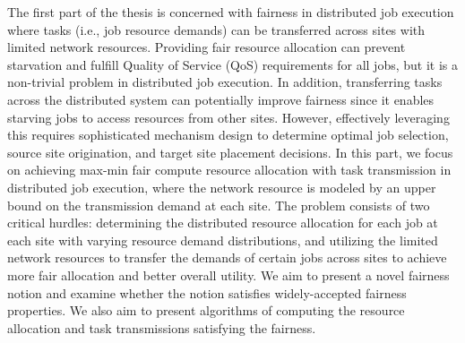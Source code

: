 The first part of the thesis is concerned with fairness in distributed job execution where tasks (i.e., job resource demands) can be transferred across sites with limited network resources. Providing fair resource allocation can prevent starvation and fulfill Quality of Service (QoS) requirements for all jobs, but it is a non-trivial problem in distributed job execution. In addition, transferring tasks across the distributed system can potentially improve fairness since it enables starving jobs to access resources from other sites. However, effectively leveraging this requires sophisticated mechanism design to determine optimal job selection, source site origination, and target site placement decisions. In this part, we focus on achieving max-min fair compute resource allocation with task transmission in distributed job execution, where the network resource is modeled by an upper bound on the transmission demand at each site. The problem consists of two critical hurdles: determining the distributed resource allocation for each job at each site with varying resource demand distributions, and utilizing the limited network resources to transfer the demands of certain jobs across sites to achieve more fair allocation and better overall utility. We aim to present a novel fairness notion and examine whether the notion satisfies widely-accepted fairness properties. We also aim to present algorithms of computing the resource allocation and task transmissions satisfying the fairness. %

